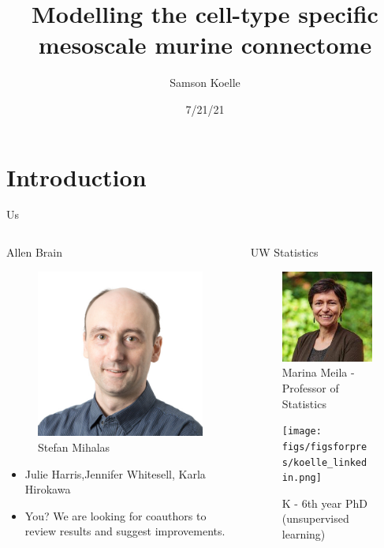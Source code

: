 \documentclass{beamer}
\title[Modelling the cell-type specific murine connectome]{Modelling the cell-type specific mesoscale murine connectome}
\author{Samson Koelle}
\institute{Allen / UW Department of Statistics}
\date{7/21/21}
\begin{document}
\begin{frame}
  \titlepage
\end{frame}


\section{Introduction}

\begin{frame}{Us}
\begin{columns}
\begin{column}{0.5\textwidth}
Allen Brain
\begin{figure}
    \centering
    \includegraphics[width = .8in]{figs/figsforpres/stefan.jpg}
    \caption{Stefan Mihalas}
\end{figure}
\begin{itemize}
    \item Julie Harris,Jennifer Whitesell, Karla Hirokawa
    \item You? We are looking for coauthors to review results and suggest improvements.
\end{itemize}

\end{column}
\begin{column}{.33\textwidth}
UW Statistics
\begin{figure}
    \centering
    \includegraphics[width = .8in]{figs/figsforpres/meila.jpeg}
    \caption{Marina Meila - Professor of Statistics}
\end{figure}

\begin{figure}
    \centering
    \texttt{[image: figs/figsforpres/koelle\_linkedin.png]}
    \caption{K - 6th year PhD  (unsupervised learning)}
\end{figure}
\end{column}
\end{columns}
\end{frame}
\end{document}
